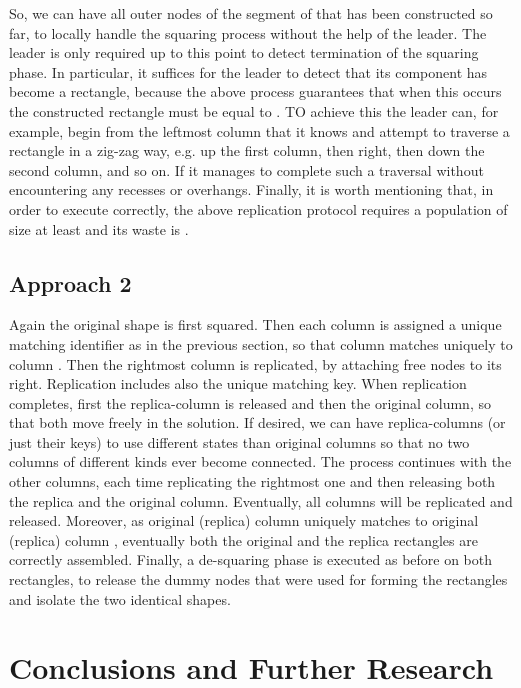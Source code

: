 \documentclass[oribibl, 11pt]{llncs}
\begin{document}
So, we can have all outer nodes of the segment of  that has been constructed so far, to locally handle the squaring process without the help of the leader. The leader is only required up to this point to detect termination of the squaring phase. In particular, it suffices for the leader to detect that its component has become a rectangle, because the above process guarantees that when this occurs the constructed rectangle must be equal to . TO achieve this the leader can, for example, begin from the leftmost column that it knows and attempt to traverse a rectangle in a zig-zag way, e.g. up the first column, then right, then down the second column, and so on. If it manages to complete such a traversal without encountering any recesses or overhangs. Finally, it is worth mentioning that, in order to execute correctly, the above replication protocol requires a population of size at least  and its waste is .

\subsection{Approach 2}

Again the original shape is first squared. Then each column is assigned a unique matching identifier as in the previous section, so that column  matches uniquely to column . Then the rightmost column is replicated, by attaching free nodes to its right. Replication includes also the unique matching key. When replication completes, first the replica-column is released and then the original column, so that both move freely in the solution. If desired, we can have replica-columns (or just their keys) to use different states than original columns so that no two columns of different kinds ever become connected. The process continues with the other columns, each time replicating the rightmost one and then releasing both the replica and the original column. Eventually, all columns will be replicated and released. Moreover, as original (replica) column  uniquely matches to original (replica) column , eventually both the original and the replica rectangles are correctly assembled. Finally, a de-squaring phase is executed as before on both rectangles, to release the dummy nodes that were used for forming the rectangles and isolate the two identical shapes.

\section{Conclusions and Further Research}
\label{sec:conclusions}
\end{document}
